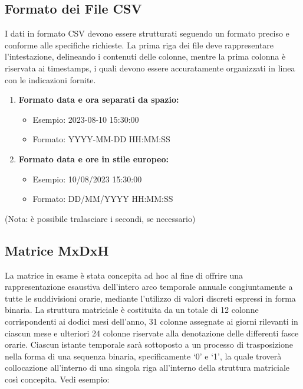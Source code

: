 \documentclass[a4paper,10pt]{article}
\begin{document}
\subsection{Formato dei File CSV}

I dati in formato CSV devono essere strutturati seguendo un formato preciso e conforme alle specifiche richieste. 
La prima riga dei file deve rappresentare l'intestazione, delineando i contenuti delle colonne, mentre la prima colonna è riservata ai timestamps, 
i quali devono essere accuratamente organizzati in linea con le indicazioni fornite.
\begin{enumerate} 
  \item \textbf{Formato data e ora separati da spazio:}
  \begin{itemize}
    \item Esempio: 2023-08-10 15:30:00
    \item Formato: YYYY-MM-DD HH:MM:SS
  \end{itemize}
  \item \textbf{Formato data e ore in stile europeo:}
  \begin{itemize}
    \item Esempio: 10/08/2023 15:30:00
    \item Formato: DD/MM/YYYY HH:MM:SS
  \end{itemize} 
\end{enumerate}

(Nota: è possibile tralasciare i secondi, se necessario)

\subsection{Matrice MxDxH}

La matrice in esame è stata concepita ad hoc al fine di offrire una rappresentazione esaustiva dell'intero arco 
temporale annuale congiuntamente a tutte le suddivisioni orarie, mediante l'utilizzo di valori discreti espressi in forma binaria. 
La struttura matriciale è costituita da un totale di 12 colonne corrispondenti ai dodici mesi dell'anno, 31 colonne assegnate 
ai giorni rilevanti in ciascun mese e ulteriori 24 colonne riservate alla denotazione delle differenti fasce orarie. 
Ciascun istante temporale sarà sottoposto a un processo di trasposizione nella forma di una sequenza binaria, specificamente `0' e `1', 
la quale troverà collocazione all'interno di una singola riga all'interno della struttura matriciale così concepita. Vedi esempio:
 
\end{document}

